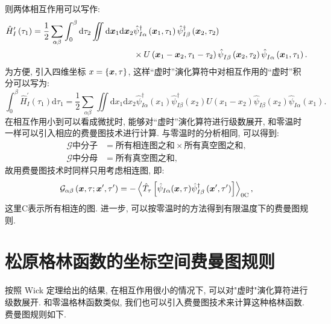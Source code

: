 则两体相互作用可以写作:
\begin{align}
 \hat{H}_I^{\prime}\left(\tau_1\right) =\frac{1}{2} \sum\limits_{\alpha\beta}\int_0^\beta  \mathrm{d} \tau_2\iint \mathrm{d} \boldsymbol{x}_1 \mathrm{d} \boldsymbol{x}_2 &\hat{\psi}_{I \alpha}^{\dagger}\left(\boldsymbol{x}_1, \tau_1\right) \hat{\psi}_{I \beta}^{\dagger}\left(\boldsymbol{x}_2, \tau_2\right)\nonumber\\
& \times U\left(\boldsymbol{x}_1-\boldsymbol{x}_2, \tau_1-\tau_2 \right) \hat{\psi}^{}_{I \beta}\left(\boldsymbol{x}_2, \tau_2\right) \hat{\psi}^{}_{I \alpha}\left(\boldsymbol{x}_1, \tau_1\right) .
\end{align}
为方便, 引入四维坐标 $x=\{\boldsymbol{x}, \tau\}$, 这样“虚时”演化算符中对相互作用的“虚时”积分可以写为:
\begin{equation}
\int_0^\beta \hat{H}_I^{\prime}\left(\tau_1\right) \mathrm{d} \tau_1=\frac{1}{2} \sum\limits_{\alpha\beta}\iint \mathrm{d} x_1 \mathrm{d} x_2 \hat{\psi}_{I \alpha}^{\dagger}\left(x_1\right) \hat{\psi}_{I \beta}^{\dagger}\left(x_2\right) U\left(x_1-x_2\right) \hat{\psi}^{}_{I \beta}\left(x_2\right) \hat{\psi}^{}_{I \alpha}\left(x_1\right).
\end{equation}
在相互作用小到可以看成微扰时, 能够对“虚时”演化算符进行级数展开, 和零温时一样可以引入相应的费曼图技术进行计算. 与零温时的分析相同, 可以得到:
\begin{align}
\mathcal{G}\text{中分子}&= \text{所有相连图之和} \times \text{所有真空图之和},\nonumber\\
\mathcal{G}\text{中分母}&= \text{所有真空图之和},
\end{align}
故用费曼图技术时同样只用考虑相连图, 即:
\begin{equation}
\mathcal{G}_{\alpha \beta}\left(\boldsymbol{x}, \tau ; \boldsymbol{x}^{\prime}, \tau^{\prime}\right)=-\left\langle\hat{T}_\tau\left[\hat{\psi}_{I \alpha}(\boldsymbol{x}, \tau) \hat{\psi}_{I \beta}^{\dagger}\left(\boldsymbol{x}^{\prime}, \tau^{\prime}\right)\right]\right\rangle_{0\mathrm{C}},
\end{equation}
这里C表示所有相连的图. 进一步, 可以按零温时的方法得到有限温度下的费曼图规则.

\section{松原格林函数的坐标空间费曼图规则}
按照 Wick 定理给出的结果, 在相互作用很小的情况下, 可以对"虚时"演化算符进行级数展开. 和零温格林函数类似, 我们也可以引入费曼图技术来计算这种格林函数. 费曼图规则如下.


